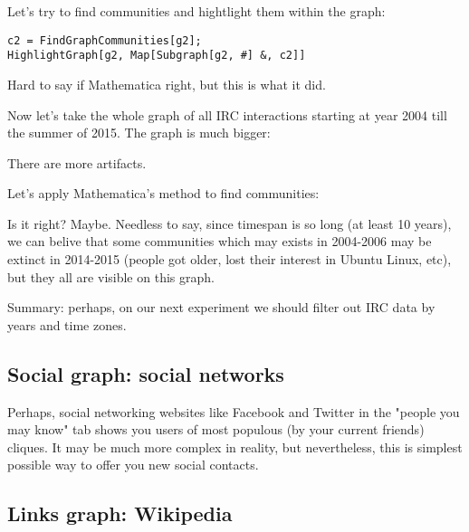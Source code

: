 Let's try to find communities and hightlight them within the graph:

\begin{lstlisting}
c2 = FindGraphCommunities[g2];
HighlightGraph[g2, Map[Subgraph[g2, #] &, c2]]
\end{lstlisting}

\begin{figure}[H]
\centering
{}
\end{figure}

Hard to say if Mathematica right, but this is what it did.

Now let's take the whole graph of all IRC interactions starting at year 2004 till the summer of 2015.
The graph is much bigger:

\begin{figure}[H]
\centering
{}
\end{figure}

There are more artifacts.

Let's apply Mathematica's method to find communities:

\begin{figure}[H]
\centering
{}
\end{figure}

Is it right? Maybe. Needless to say, since timespan is so long (at least 10 years), we can belive that some communities which may exists in 2004-2006 may be
extinct in 2014-2015 (people got older, lost their interest in Ubuntu Linux, etc), but they all are visible on this graph.

Summary: perhaps, on our next experiment we should filter out IRC data by years and time zones.

\subsection{Social graph: social networks}

Perhaps, social networking websites like Facebook and Twitter in the "people you may know" tab shows you users of most populous (by your current friends) cliques.
It may be much more complex in reality, but nevertheless, this is simplest possible way to offer you new social contacts.

\subsection{Links graph: Wikipedia}


